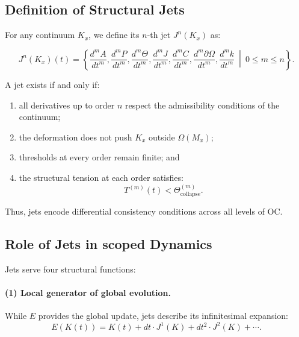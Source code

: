 \subsection{Definition of Structural Jets}

For any continuum $K_x$, we define its $n$-th jet $J^n(K_x)$ as:

\begin{equation}
J^n(K_x)(t) = 
\left\{
\frac{d^m A}{dt^m},
\frac{d^m P}{dt^m},
\frac{d^m \Theta}{dt^m},
\frac{d^m J}{dt^m},
\frac{d^m C}{dt^m},
\frac{d^m \partial\Omega}{dt^m},
\frac{d^m k}{dt^m}
\ \middle|\ 
0 \le m \le n
\right\}.
\end{equation}

A jet exists if and only if:

\begin{enumerate}
    \item all derivatives up to order $n$ respect the admissibility
    conditions of the continuum;
    \item the deformation does not push $K_x$ outside $\Omega(M_x)$;
    \item thresholds at every order remain finite; and
    \item the structural tension at each order satisfies:
    \[
        T^{(m)}(t) < \Theta_{\mathrm{collapse}}^{(m)}.
    \]
\end{enumerate}

Thus, jets encode differential consistency conditions across all levels
of OC.



\subsection{Role of Jets in scoped Dynamics}

Jets serve four structural functions:

\paragraph{(1) Local generator of global evolution.}
While $E$ provides the global update, jets describe its infinitesimal
expansion:
\[
E(K(t)) = K(t) + dt \cdot J^1(K) + dt^2 \cdot J^2(K) + \cdots.
\]

